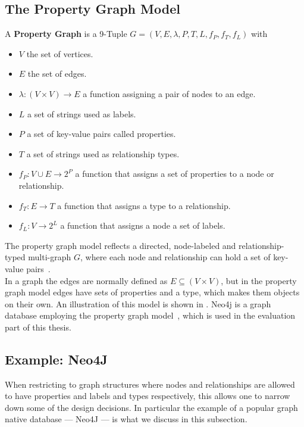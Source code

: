     \subsection{The Property Graph Model}\label{\positionnumber}
        A \textbf{Property Graph} is a 9-Tuple $G = (V, E, \lambda, P, T, L, f_P, f_T, f_L)$ with 
        \begin{itemize}
            \item $V$ the set of vertices.
            \item $E$ the set of edges.
            \item $\lambda: (V \times V) \rightarrow E$ a function assigning a pair of nodes to an edge.
            \item $L$ a set of strings used as labels.
            \item $P$ a set of key-value pairs called properties.
            \item $T$ a set of strings used as relationship types.
            \item $f_P: V \cup E \rightarrow 2^P$ a function that assigns a set of properties to a node or relationship.
        \item $f_T: E \rightarrow T$ a function that assigns a type to  a relationship.
        \item  $f_L: V \rightarrow 2^L$ a function that assigns a node a set of labels.
        \end{itemize} 
        \smallskip
        The property graph model reflects a directed, node-labeled and relationship-typed multi-graph $G$, where each node and relationship can hold a set of key-value pairs~\cite{angles2018property}. \\
            In a graph the edges are normally defined as $E \subseteq (V \times V)$, but in the property graph model edges have sets of properties and a type, which makes them objects on their own.
            An illustration of this model is shown in .
        Neo4j is a graph database employing the property graph model~\cite{neo4j_book}, which is used in the evaluation part of this thesis.
    
    \subsection{Example: Neo4J}\label{\positionnumber}
            When restricting to graph structures where nodes and relationships are allowed to have properties and labels and types respectively, this allows one to narrow down some of the design decisions.
            In particular the example of a popular graph native database --- Neo4J --- is what we discuss in this subsection.

